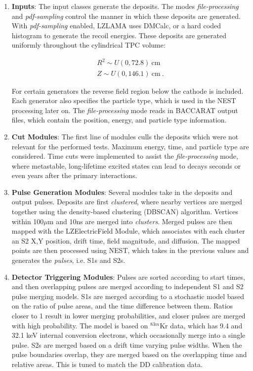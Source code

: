 \begin{enumerate}
    \item \textbf{Inputs}: The input classes generate the deposits.
    The modes \textit{file-processing} and \textit{pdf-sampling} control the manner in which these deposits are generated. 
    With \textit{pdf-sampling} enabled, LZLAMA uses DMCalc, or a hard coded histogram to generate the recoil energies. 
    These deposits are generated uniformly throughout the cylindrical TPC volume: 
    
   \begin{align}
        R^2 \sim U(0, 72.8) \mathrm{~cm}\\
        Z \sim U(0, 146.1) \mathrm{~cm}~.
   \end{align}
   
    For certain generators the reverse field region below the cathode is included.
    Each generator also specifies the particle type, which is used in the NEST processing later on.
    The \textit{file-processing} mode reads in BACCARAT output files, which contain the position, energy, and particle type information.
    \item \textbf{Cut Modules}: The first line of modules culls the deposits which were not relevant for the performed tests.
    Maximum energy, time, and particle type are considered.
    Time cuts were implemented to assist the \textit{file-processing} mode, where metastable, long-lifetime excited states can lead to decays seconds or even years after the primary interactions.
    \item \textbf{Pulse Generation Modules}: Several modules take in the deposits and output pulses. 
    Deposits are first \textit{clustered}, where nearby vertices are merged together using the density-based clustering (DBSCAN\cite{ester_density-based_1996}) algorithm.
    Vertices within 100$\mu$m and 10ns are merged into \textit{clusters}.
    Merged pulses are then mapped with the LZElectricField Module, which associates with each cluster an S2 X,Y position, drift time, field magnitude, and diffusion.
    The mapped points are then processed using NEST\cite{szydagis_nest_2011, szydagis_review_2021}, which takes in the previous values and generates the \textit{pulses}, i.e. S1s and S2s. 
    \item \textbf{Detector Triggering Modules}:  Pulses are sorted according to start times, and then overlapping pulses are merged according to independent S1 and S2 pulse merging models.
    S1s are merged according to a stochastic model based on the ratio of pulse areas, and the time difference between them.
    Ratios closer to 1 result in lower merging probabilities, and closer pulses are merged with high probability.
    The model is based on $^{83m}$Kr data, which has 9.4 and 32.1 keV internal conversion electrons\cite{kastens_calibration_2009}, which occasionally merge into a single pulse.
    S2s are merged based on a drift time varying pulse widths. 
    When the pulse boundaries overlap, they are merged based on the overlapping time and relative areas. 
    This is tuned to match the DD calibration data.
    

\end{enumerate}
